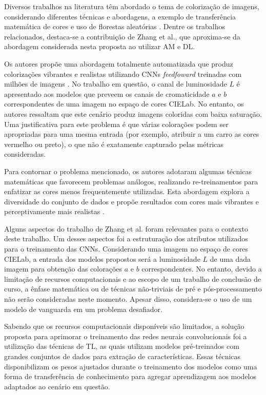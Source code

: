 Diversos trabalhos na literatura têm abordado o tema de colorização de imagens, considerando diferentes técnicas e abordagens, a exemplo de transferência matemática de cores e uso de florestas aleatórias  \cite{ref:rel-zhang,ref:rel-deshpande,ref:rel-welsh}. Dentre os trabalhos relacionados, destaca-se a contribuição de Zhang et al., que aproxima-se da abordagem considerada nesta proposta ao utilizar AM e DL.

Os autores propõe uma abordagem totalmente automatizada que produz colorizações vibrantes e realistas utilizando CNNs \emph{feedfoward} treinadas com milhões de imagens \cite{ref:rel-zhang}. No trabalho em questão, o canal de luminosidade $L$ é apresentado aos modelos que preveem os canais de cromaticidade $a$ e $b$ correspondentes de uma imagem no espaço de cores CIELab. No entanto, os autores ressaltam que este cenário produz imagens coloridas com baixa saturação. Uma justificativa para este problema é que várias colorações podem ser apropriadas para uma mesma entrada (por exemplo, atribuir a um carro as cores vermelho ou preto), o que não é exatamente capturado pelas métricas consideradas.

Para contornar o problema mencionado, os autores adotaram algumas técnicas matemáticas que favorecem problemas análogos, realizando re-treinamentos para enfatizar as cores menos frequentemente utilizadas. Esta abordagem explora a diversidade do conjunto de dados e propõe resultados com cores mais vibrantes e perceptivamente mais realistas \cite{ref:rel-zhang}.


Alguns aspectos do trabalho de Zhang et al. foram relevantes para o contexto deste trabalho. Um desses aspectos foi a estruturação dos atributos utilizados para o treinamento das CNNs. Considerando uma imagem no espaço de cores CIELab, a entrada dos modelos propostos será a luminosidade $L$ de uma dada imagem para obtenção das colorações $a$ e $b$ correspondentes. No entanto, devido a limitação de recursos computacionais e ao escopo de um trabalho de conclusão de curso, a ênfase matemática ou de técnicas não-triviais de pré e pós-processamento não serão consideradas neste momento. Apesar disso, considera-se o uso de um modelo de vanguarda em um problema desafiador.

Sabendo que os recursos computacionais disponíveis são limitados, a solução proposta para aprimorar o treinamento das redes neurais convolucionais foi a utilização das técnicas de TL, as quais utilizam modelos pré-treinados com grandes conjuntos de dados para extração de características. Essas técnicas disponibilizam os pesos ajustados durante o treinamento dos modelos como uma forma de transferência de conhecimento para agregar aprendizagem aos modelos adaptados ao cenário em questão.
